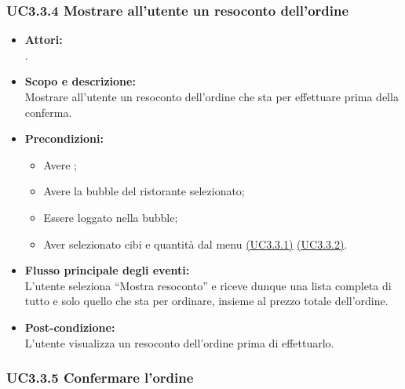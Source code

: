 \subsubsection{UC3.3.4 Mostrare all’utente un resoconto dell’ordine} \label{UC3.3.4}

\begin{itemize}
	\item \textbf{Attori:}
	\\.
	\item \textbf{Scopo e descrizione:} 
	\\Mostrare all’utente un resoconto dell’ordine che sta per effettuare prima della conferma.
	\item \textbf{Precondizioni:}
	\begin{itemize}
		\item Avere ;
		\item Avere la bubble del ristorante selezionato;
		\item Essere loggato nella bubble;
		\item Aver selezionato cibi e quantità dal menu \hyperref[UC3.3.1]{(UC3.3.1)} \hyperref[UC3.3.2]{(UC3.3.2)}.
	\end{itemize}
	\item \textbf{Flusso principale degli eventi:}
	\\L’utente seleziona “Mostra resoconto” e riceve dunque una lista completa di tutto e solo quello che sta per ordinare, insieme al prezzo totale dell’ordine.
	\item \textbf{Post-condizione:}
	\\L’utente visualizza un resoconto dell’ordine prima di effettuarlo.
\end{itemize}

\subsubsection{UC3.3.5 Confermare l’ordine} \label{UC3.3.5}

